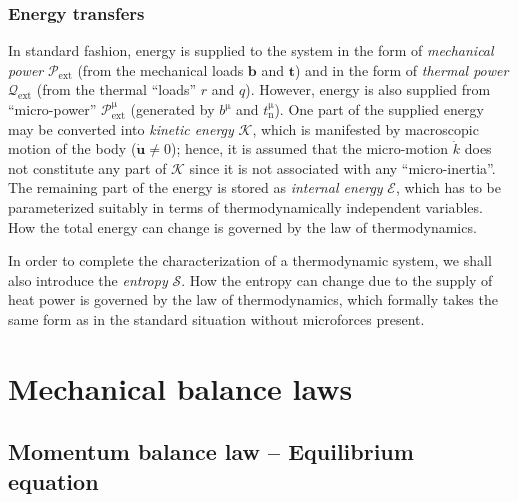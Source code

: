 \subsubsection{Energy transfers}
In standard fashion, energy is supplied to the system in the form of
{\em mechanical power} ${\mathcal P}_{\mathrm{ext}}$ (from the mechanical loads
${\bm b}$ and ${\bm t}$) and in the form of {\em thermal power} 
${\mathcal Q}_{\mathrm{ext}}$ (from the thermal ``loads'' $r$ and $q$).
However, energy is also supplied from ``micro-power''
${\mathcal P}_{\mathrm{ext}}^{\mathrm{\mu}}$ 
(generated by $b^{\mathrm{\mu}}$ and $t_{\mathrm{n}}^{\mathrm{\mu}}$).
One part of the supplied energy may be converted into {\em kinetic
energy} ${\mathcal K}$, which is manifested by macroscopic motion of the
body ($\dot{\bm u} \neq 0$); hence, it is assumed that the micro-motion 
$\dot{k}$ does not constitute any part of ${\mathcal K}$ since it is not
 associated with any ``micro-inertia''. 
The remaining part of the energy is
stored as {\em internal energy} ${\mathcal E}$, which has to be
parameterized suitably in terms of thermodynamically independent variables.
How the total energy can change is governed by the  law of thermodynamics.

In order to complete the characterization of a thermodynamic system,
we shall also introduce the {\em entropy} ${\mathcal S}$. 
How the entropy can change due to the supply of heat power is governed by the
 law of thermodynamics, which formally takes the same form as in the 
standard situation without microforces present.

\section{Mechanical balance laws}

\subsection{Momentum balance law -- Equilibrium equation}

